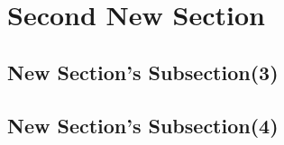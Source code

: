 \documentclass[twoside, twocolumn]{article}
\begin{document}
\section{Second New Section}
\subsection{New Section's Subsection(3)}
\begin{verse}
\lipsum[1]
\end{verse}
\subsection{New Section's Subsection(4)}
\begin{verse}
\lipsum[2]
\end{verse}
\end{document}
